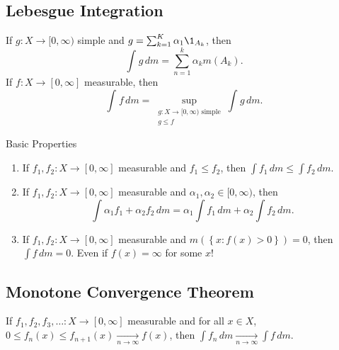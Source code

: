 \subsection{Lebesgue Integration}

\begin{definition}
If $g : X \to [0, \infty)$ simple and $g = \sum_{k = 1}^{K} \alpha_1 \1_{A_k}$, then
\[
	\int_{}^{} g \,dm = \sum_{n = 1}^{k} \alpha_k m(A_k).
\]
If $f : X \to [0, \infty]$ measurable, then
\[
	\int_{}^{} f \,dm = \sup_{\substack{g : X  \to [0, \infty) \textrm{ simple} \\ g \leq f}} \int_{}^{} g \,dm.
\]
\end{definition}

Basic Properties
\begin{enumerate}
	\item If $f_1, f_2 : X \to [0, \infty]$ measurable and $f_1 \leq f_2$, then $\int f_1 \, dm \leq \int f_2 \, dm$.
	\item If $f_1, f_2 : X \to [0, \infty]$ measurable and $\alpha_1, \alpha_2 \in [0, \infty)$, then
	\[
		\int \alpha_1 f_1 + \alpha_2 f_2 \, dm = \alpha_1 \int f_1 \, dm + \alpha_2 \int f_2 \, dm.
	\]
	\item If $f_1, f_2 : X \to [0, \infty]$ measurable and $m( \left\{x : f(x) > 0 \right\}) = 0$, then $\int f \,dm = 0$. Even if $f(x) = \infty$ for some $x$!
\end{enumerate}

\subsection{Monotone Convergence Theorem}

\begin{theorem}
	If $f_1, f_2, f_3, \ldots : X \to [0, \infty]$ measurable and for all $x \in X$, $0 \leq f_n(x) \leq f_{n+1}(x) \xrightarrow[n \to \infty]{} f(x)$, then $\int f_n \, dm \xrightarrow[n \to \infty]{} \int f \, dm$.
\end{theorem}

